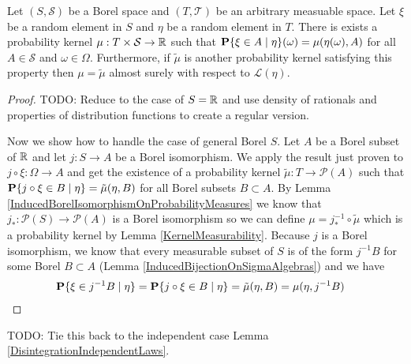 \begin{thm}\label{ExistenceConditionalDistribution}Let $(S, \mathcal{S})$ be a Borel space and
  $(T, \mathcal{T})$ be an arbitrary measuable space.  Let $\xi$ be a
  random element in $S$ and $\eta$ be a random element in $T$.  There
  is exists a probability kernel $\mu : T \times \mathcal{S} \to
  \mathbb{R}$ such that $\textbf{P}\{\xi \in A \mid \eta \}(\omega) =
  \mu(\eta(\omega), A)$ for all $A \in \mathcal{S}$ and $\omega \in
  \Omega$.  Furthermore, if $\tilde{\mu}$ is another probability
  kernel satisfying this property then $\mu = \tilde{\mu}$ almost
  surely with respect to $\mathcal{L}(\eta)$.
\end{thm}
\begin{proof}
TODO:  Reduce to the case of $S = \mathbb{R}$ and use density of rationals
and properties of distribution functions to create a regular version.

Now we show how to handle the case of general Borel $S$.  Let $A$ be a
Borel subset of $\mathbb{R}$ and let $j : S \to A$ be a Borel
isomorphism.  We apply the result just proven to $j  \circ \xi :
\Omega \to A$ and get the existence of a probability kernel $\tilde{\mu} : T
\to \mathcal{P}(A)$ such that $\textbf{P}\{j \circ \xi \in B \mid \eta\}
= \tilde{\mu}(\eta, B)$ for all Borel subsets $B \subset A$.  By Lemma
\ref{InducedBorelIsomorphismOnProbabilityMeasures} we know that $j_* :
\mathcal{P}(S) \to \mathcal{P}(A)$ is a Borel isomorphism so we can
define $\mu = j^{-1}_* \circ \tilde{\mu}$ which is a
probability kernel by Lemma \ref{KernelMeasurability}.  Because $j$ is
a Borel isomorphism, we know that every measurable subset of $S$ is of
the form $j^{-1}B$ for some Borel $B \subset A$ (Lemma
\ref{InducedBijectionOnSigmaAlgebras}) and we have
\begin{align*}
\textbf{P}\{\xi \in j^{-1}B \mid \eta\} &= \textbf{P}\{j \circ
  \xi \in B \mid \eta\} = \tilde{\mu}(\eta, B) = \mu(\eta, j^{-1}B)
\end{align*}
\end{proof}

TODO:  Tie this back to the independent case
Lemma \ref{DisintegrationIndependentLaws}.


